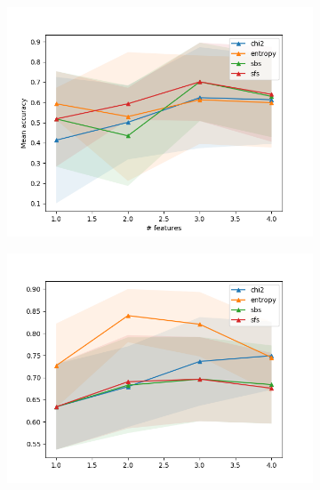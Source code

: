 \begin{figure}[htbp]
  \centering
  \begin{subfigure}[b]{0.475\textwidth}
      \centering
      \includegraphics[width=\textwidth]{../plots_with_std_fill/CARTd1.png}
      \caption[]%
      {{\small}}
      \label{fig:CART_MIAS}
  \end{subfigure}
  \hfill
  \begin{subfigure}[b]{0.475\textwidth}
      \centering
      \includegraphics[width=\textwidth]{../plots_with_std_fill/CARTd2.png}
      \caption[]%
      {{\small}}
      \label{fig:CART_EN}
  \end{subfigure}


\end{figure}
